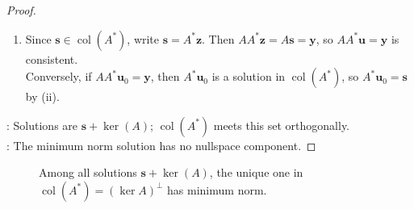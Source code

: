 \begin{theorem}
\begin{proof}
\begin{enumerate}[label=(\roman*)]
\item Since $\mathbf{s}\in\operatorname{col}(A^*)$, write $\mathbf{s}=A^*\mathbf{z}$. Then $AA^*\mathbf{z}=A\mathbf{s}=\mathbf{y}$, so $AA^*\mathbf{u}=\mathbf{y}$ is consistent.\\
Conversely, if $AA^*\mathbf{u}_0=\mathbf{y}$, then $A^*\mathbf{u}_0$ is a solution in $\operatorname{col}(A^*)$, so $A^*\mathbf{u}_0=\mathbf{s}$ by (ii).
\end{enumerate}
: Solutions are $\mathbf{s}+\ker(A)$; $\operatorname{col}(A^*)$ meets this set orthogonally.\\
: The minimum norm solution has no nullspace component.
\end{proof}
\end{theorem}

\begin{figure}[H]
  \centering
  
  \caption{Among all solutions $\mathbf{s}+\ker(A)$, the unique one in $\operatorname{col}(A^*)=(\ker A)^\perp$ has minimum norm.}
  \label{fig:minimum-norm-solution}
\end{figure}
